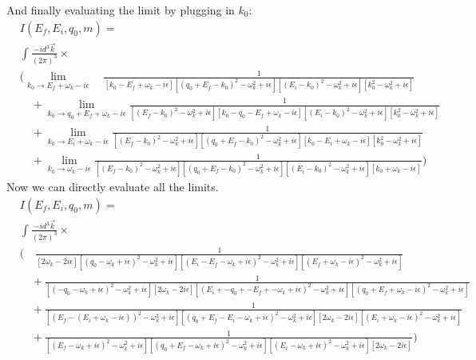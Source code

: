 And finally evaluating the limit by plugging in $k_0$:
\begin{align*}
&I(E_f, E_i, q_0, m) = \\
&\int \frac{-i d^3 \vec{k}}{(2\pi)^3} \times\\
&\bigg(\lim_{k_0 \to E_f + \omega_k - i \epsilon}\quad\frac{1}{
\left[k_0 -E_f + \omega_k - i \epsilon\right]
\left[(q_0 + E_f - k_0)^2 - \omega_k^2 + i\epsilon\right]
\left[(E_i - k_0)^2 - \omega_k^2 + i\epsilon\right]
\left[k_0^2 - \omega_k^2 + i\epsilon\right]
} \\
&\quad + \lim_{k_0 \to q_0 + E_f + \omega_k - i \epsilon}\frac{1}{
\left[(E_f - k_0)^2 - \omega_k^2 + i\epsilon\right]
\left[k_0 -q_0 - E_f + \omega_k - i \epsilon\right]%
\left[(E_i - k_0)^2 - \omega_k^2 + i\epsilon\right]
\left[k_0^2 - \omega_k^2 + i\epsilon\right]
} \\
&\quad + \lim_{k_0 \to E_i + \omega_k - i \epsilon}\frac{1}{
\left[(E_f - k_0)^2 - \omega_k^2 + i\epsilon\right]
\left[(q_0 + E_f - k_0)^2 - \omega_k^2 + i\epsilon\right]
\left[k_0 - E_i + \omega_k - i \epsilon\right]%
\left[k_0^2 - \omega_k^2 + i\epsilon\right]
} \\
&\quad + \lim_{k_0 \to \omega_k - i \epsilon}\frac{1}{
\left[(E_f - k_0)^2 - \omega_k^2 + i\epsilon\right]
\left[(q_0 + E_f - k_0)^2 - \omega_k^2 + i\epsilon\right]
\left[(E_i - k_0)^2 - \omega_k^2 + i\epsilon\right]
\left[k_0 + \omega_k - i \epsilon\right]%
} \bigg)
\end{align*}
Now we can directly evaluate all the limits.
\begin{align*}
&I(E_f, E_i, q_0, m) = \\
&\int \frac{-i d^3 \vec{k}}{(2\pi)^3} \times\\
&\bigg(\quad\frac{1}{
\left[2\omega_k - 2i \epsilon\right]
\left[(q_0 - \omega_k + i \epsilon)^2 - \omega_k^2 + i\epsilon\right]
\left[(E_i - E_f - \omega_k + i \epsilon)^2 - \omega_k^2 + i\epsilon\right]
\left[(E_f + \omega_k - i \epsilon)^2 - \omega_k^2 + i\epsilon\right]
} \\
&\quad + \frac{1}{
\left[( - q_0  - \omega_k + i \epsilon)^2 - \omega_k^2 + i\epsilon\right]
\left[2\omega_k - 2i \epsilon\right]%
\left[(E_i + -q_0 + -E_f + -\omega_k + i \epsilon)^2 - \omega_k^2 + i\epsilon\right]
\left[(q_0 + E_f + \omega_k - i \epsilon)^2 - \omega_k^2 + i\epsilon\right]
} \\
&\quad + \frac{1}{
\left[(E_f - (E_i + \omega_k - i \epsilon))^2 - \omega_k^2 + i\epsilon\right]
\left[(q_0 + E_f - E_i - \omega_k + i \epsilon)^2 - \omega_k^2 + i\epsilon\right]
\left[2\omega_k - 2i \epsilon\right]%
\left[(E_i + \omega_k - i \epsilon)^2 - \omega_k^2 + i\epsilon\right]
} \\
&\quad + \frac{1}{
\left[(E_f - \omega_k + i \epsilon)^2 - \omega_k^2 + i\epsilon\right]
\left[(q_0 + E_f - \omega_k + i \epsilon)^2 - \omega_k^2 + i\epsilon\right]
\left[(E_i - \omega_k + i \epsilon)^2 - \omega_k^2 + i\epsilon\right]
\left[2\omega_k - 2i \epsilon\right]%
} \bigg)
\end{align*}
